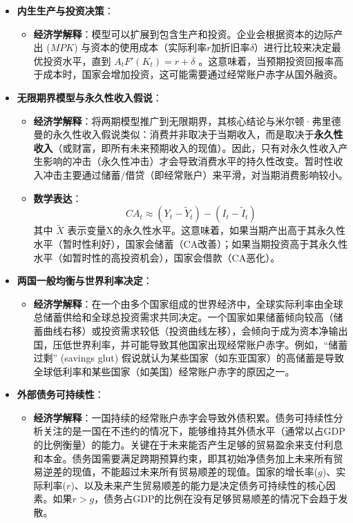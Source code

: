 \documentclass[12pt]{article}
\begin{document}
\begin{itemize}
\begin{itemize}
    \end{itemize}
    \item \textbf{内生生产与投资决策}：
    \begin{itemize}
        \item \textbf{经济学解释}：模型可以扩展到包含生产和投资。企业会根据资本的边际产出 ($MPK$) 与资本的使用成本（实际利率$r$加折旧率$\delta$）进行比较来决定最优投资水平，直到 $A_t F'(K_t) = r + \delta$ 。这意味着，当预期投资回报率高于成本时，国家会增加投资，这可能需要通过经常账户赤字从国外融资。
    \end{itemize}
    \item \textbf{无限期界模型与永久性收入假说}：
    \begin{itemize}
        \item \textbf{经济学解释}：将两期模型推广到无限期界，其核心结论与米尔顿·弗里德曼的永久性收入假说类似：消费并非取决于当期收入，而是取决于\textbf{永久性收入}（或财富，即所有未来预期收入的现值）。因此，只有对永久性收入产生影响的冲击（永久性冲击）才会导致消费水平的持久性改变。暂时性收入冲击主要通过储蓄/借贷（即经常账户）来平滑，对当期消费影响较小。
        \item \textbf{数学表达}：
        \[
        CA_t \approx (Y_t - \tilde{Y}_t) - (I_t - \tilde{I}_t)
        \]
        其中 $\tilde{X}$ 表示变量X的永久性水平。这意味着，如果当期产出高于其永久性水平（暂时性利好），国家会储蓄（CA改善）；如果当期投资高于其永久性水平（如暂时性的高投资机会），国家会借款（CA恶化）。
    \end{itemize}
    \item \textbf{两国一般均衡与世界利率决定}：
    \begin{itemize}
        \item \textbf{经济学解释}：在一个由多个国家组成的世界经济中，全球实际利率由全球总储蓄供给和全球总投资需求共同决定。一个国家如果储蓄倾向较高（储蓄曲线右移）或投资需求较低（投资曲线左移），会倾向于成为资本净输出国，压低世界利率，并可能导致其他国家出现经常账户赤字。例如，“储蓄过剩” (savings glut) 假说就认为某些国家（如东亚国家）的高储蓄是导致全球低利率和某些国家（如美国）经常账户赤字的原因之一。
    \end{itemize}
    \item \textbf{外部债务可持续性}：
    \begin{itemize}
        \item \textbf{经济学解释}：一国持续的经常账户赤字会导致外债积累。债务可持续性分析关注的是一国在不违约的情况下，能够维持其外债水平（通常以占GDP的比例衡量）的能力。关键在于未来能否产生足够的贸易盈余来支付利息和本金。债务国需要满足跨期预算约束，即其初始净债务加上未来所有贸易逆差的现值，不能超过未来所有贸易顺差的现值。国家的增长率($g$)、实际利率($r$)、以及未来产生贸易顺差的能力是决定债务可持续性的核心因素。如果$r > g$，债务占GDP的比例在没有足够贸易顺差的情况下会趋于发散。
    \end{itemize}
\end{itemize}
\end{document}
